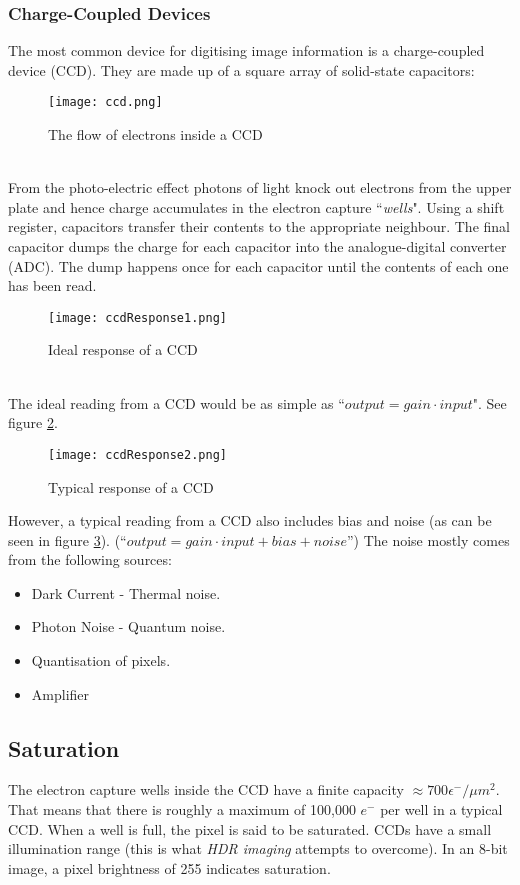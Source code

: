 \documentclass{article}\author{Hawley, Adam}
\begin{document}
\subsubsection{Charge-Coupled Devices}
The most common device for digitising image information is a charge-coupled device (CCD). 
They are made up of a square array of solid-state capacitors: \\
\begin{figure}[htbp]
	\centering
	\texttt{[image: ccd.png]}
	\caption{The flow of electrons inside a CCD}
	\label{fig:CCD}
\end{figure} \\
From the photo-electric effect photons of light knock out electrons from the upper plate and hence charge accumulates in the electron capture ``{\it wells}".
Using a shift register, capacitors transfer their contents to the appropriate neighbour.
The final capacitor dumps the charge for each capacitor into the analogue-digital converter (ADC).
The dump happens once for each capacitor until the contents of each one has been read. \\
\begin{figure}
	\centering
	\texttt{[image: ccdResponse1.png]}
	\caption{Ideal response of a CCD}
	\label{fig:ccdResponse1}
\end{figure}
\\
The ideal reading from a CCD would be as simple as ``$output = gain\cdot input$". See figure \ref{fig:ccdResponse1}.
\begin{figure}
	\centering
	\texttt{[image: ccdResponse2.png]}
	\caption{Typical response of a CCD}
	\label{fig:ccdResponse2}
\end{figure}
However, a typical reading from a CCD also includes bias and noise (as can be seen in figure \ref{fig:ccdResponse2}).
(``$output = gain \cdot input + bias + noise$'')
The noise mostly comes from the following sources:
\begin{itemize}
	\item Dark Current - Thermal noise.
	\item Photon Noise - Quantum noise.
	\item Quantisation of pixels.
	\item Amplifier
\end{itemize}
\newpage
\subsection{Saturation}
The electron capture wells inside the CCD have a finite capacity $\approx 700 \epsilon ^-/\mu m^2$.
That means that there is roughly a maximum of 100,000 $e^-$ per well in a typical CCD.
When a well is full, the pixel is said to be saturated.
CCDs have a small illumination range (this is what {\it HDR imaging} attempts to overcome).
In an 8-bit image, a pixel brightness of 255 indicates saturation.
\end{document}
